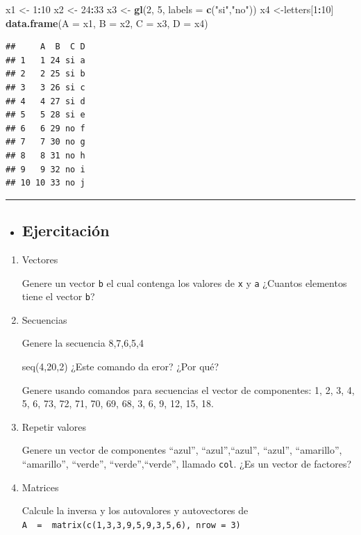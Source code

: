 \documentclass[]{book}
\newenvironment{Shaded}{\begin{snugshade}}{\end{snugshade}}
\newcommand{\KeywordTok}[1]{\textcolor[rgb]{0.13,0.29,0.53}{\textbf{#1}}}
\newcommand{\DataTypeTok}[1]{\textcolor[rgb]{0.13,0.29,0.53}{#1}}
\newcommand{\DecValTok}[1]{\textcolor[rgb]{0.00,0.00,0.81}{#1}}
\newcommand{\StringTok}[1]{\textcolor[rgb]{0.31,0.60,0.02}{#1}}
\newcommand{\OperatorTok}[1]{\textcolor[rgb]{0.81,0.36,0.00}{\textbf{#1}}}
\newcommand{\NormalTok}[1]{#1}
\newenvironment{rmdblock}[1]
{\begin{shaded*}
		\begin{itemize}
			\renewcommand{\labelitemi}{
				\raisebox{-.7\height}[0pt][0pt]{
					{\setkeys{Gin}{width=3em,keepaspectratio}\texttt{[image: images/\#1]}}
				}
			}
			\item
		}
		{
		\end{itemize}
	\end{shaded*}
}
\newenvironment{rmdtip}
{\begin{rmdblock}{tip}}
	{\end{rmdblock}}
\begin{document}
\begin{Shaded}
\begin{Highlighting}[]
\NormalTok{x1 <-}\StringTok{ }\DecValTok{1}\OperatorTok{:}\DecValTok{10}
\NormalTok{x2 <-}\StringTok{ }\DecValTok{24}\OperatorTok{:}\DecValTok{33}
\NormalTok{x3 <-}\StringTok{ }\KeywordTok{gl}\NormalTok{(}\DecValTok{2}\NormalTok{, }\DecValTok{5}\NormalTok{, }\DataTypeTok{labels =} \KeywordTok{c}\NormalTok{(}\StringTok{"si"}\NormalTok{,}\StringTok{"no"}\NormalTok{))}
\NormalTok{x4 <-letters[}\DecValTok{1}\OperatorTok{:}\DecValTok{10}\NormalTok{]}
\KeywordTok{data.frame}\NormalTok{(}\DataTypeTok{A =}\NormalTok{ x1, }\DataTypeTok{B =}\NormalTok{ x2, }\DataTypeTok{C =}\NormalTok{ x3, }\DataTypeTok{D =}\NormalTok{ x4)}
\end{Highlighting}
\end{Shaded}

\begin{verbatim}
##     A  B  C D
## 1   1 24 si a
## 2   2 25 si b
## 3   3 26 si c
## 4   4 27 si d
## 5   5 28 si e
## 6   6 29 no f
## 7   7 30 no g
## 8   8 31 no h
## 9   9 32 no i
## 10 10 33 no j
\end{verbatim}

\begin{center}\rule{0.5\linewidth}{\linethickness}\end{center}

\begin{rmdtip}
\hypertarget{ejercitacion}{%
\subsection{Ejercitación}\label{ejercitacion}}
\end{rmdtip}

\begin{boxeda}
\begin{enumerate}
\def\labelenumi{\arabic{enumi}.}
\item
  Vectores

  Genere un vector \texttt{b} el cual contenga los valores de \texttt{x}
  y \texttt{a} ¿Cuantos elementos tiene el vector \texttt{b}?
\item
  Secuencias

  Genere la secuencia 8,7,6,5,4

  seq(4,20,2) ¿Este comando da eror? ¿Por qué?

  Genere usando comandos para secuencias el vector de componentes: 1, 2,
  3, 4, 5, 6, 73, 72, 71, 70, 69, 68, 3, 6, 9, 12, 15, 18.
\item
  Repetir valores

  Genere un vector de componentes ``azul'', ``azul'',``azul'', ``azul'',
  ``amarillo'', ``amarillo'', ``verde'', ``verde'',``verde'', llamado
  \texttt{col}. ¿Es un vector de factores?
\item
  Matrices

  Calcule la inversa y los autovalores y autovectores de
  \texttt{A\ \ =\ \ matrix(c(1,3,3,9,5,9,3,5,6),\ nrow\ =\ 3)}
\end{enumerate}
\end{boxeda}
\end{document}
